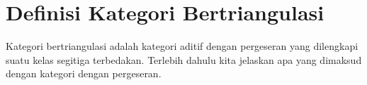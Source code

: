 
\section{Definisi Kategori Bertriangulasi}\label{sec:triangular-def}
\hypertarget{o014.aljabr2.chapter4.triangulated-category-definition}{ }

Kategori bertriangulasi adalah kategori aditif dengan pergeseran yang
dilengkapi suatu kelas segitiga terbedakan. Terlebih dahulu kita jelaskan apa
yang dimaksud dengan kategori dengan pergeseran.

